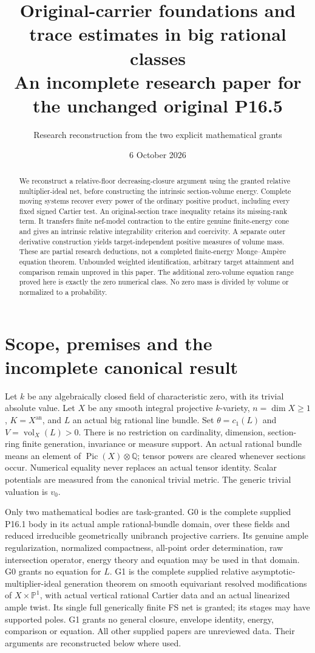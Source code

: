 \documentclass[10pt]{article}
\title{Original-carrier foundations and trace estimates in big rational classes\\
\large An incomplete research paper for the unchanged original P16.5}
\author{Research reconstruction from the two explicit mathematical grants}
\date{6 October 2026}
\newcommand{\vol}{\operatorname{vol}}
\newcommand{\an}{\mathrm{an}}
\begin{document}
\maketitle
\begin{abstract}
We reconstruct a relative-floor decreasing-closure argument using the granted
relative multiplier-ideal net, before constructing the intrinsic section-volume
energy. Complete moving systems recover every power of the ordinary positive
product, including every fixed signed Cartier test. An original-section trace
inequality retains its missing-rank term. It transfers finite nef-model
contraction to the entire genuine finite-energy cone and gives an intrinsic
relative integrability criterion and coercivity. A separate outer derivative
construction yields target-independent positive measures of volume mass.
These are partial research deductions, not a completed finite-energy
Monge--Amp\`ere equation theorem. Unbounded weighted identification, arbitrary
target attainment and comparison remain unproved in this paper. The additional
zero-volume equation range proved here is exactly the zero numerical class.
No zero mass is divided by volume or normalized to a probability.
\end{abstract}

\section{Scope, premises and the incomplete canonical result}
Let $k$ be any algebraically closed field of characteristic zero, with its
trivial absolute value. Let $X$ be any smooth integral projective $k$-variety,
$n=\dim X\geq1$, $K=X^\an$, and $L$ an actual big rational line bundle.
Set $\theta=c_1(L)$ and $V=\vol_X(L)>0$.
There is no restriction on cardinality, dimension, section-ring finite
generation, invariance or measure support. An actual rational bundle means
an element of $\operatorname{Pic}(X)\otimes\mathbb Q$; tensor powers are
cleared whenever sections occur. Numerical equality never replaces an actual
tensor identity. Scalar potentials are measured from the canonical trivial
metric. The generic trivial valuation is $v_0$.

Only two mathematical bodies are task-granted. G0 is the complete supplied
P16.1 body in its actual ample rational-bundle domain, over these fields and
reduced irreducible geometrically unibranch projective carriers. Its genuine
ample regularization, normalized compactness, all-point order determination,
raw intersection operator, energy theory and equation may be used in that
domain. G0 grants no equation for $L$. G1 is the complete supplied relative
asymptotic-multiplier-ideal generation theorem on smooth equivariant resolved
modifications of $X\times\mathbb P^1$, with actual vertical rational Cartier
data and an actual linearized ample twist. Its single full generically finite
FS net is granted; its stages may have supported poles. G1 grants no general
closure, envelope identity, energy, comparison or equation. All other supplied
papers are unreviewed data. Their arguments are reconstructed below where used.
\end{document}
